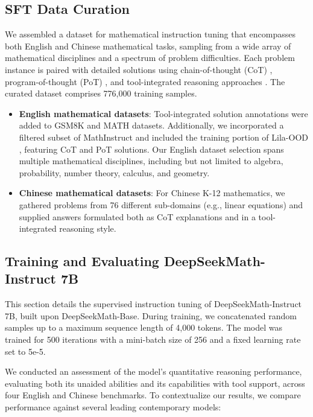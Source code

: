 \begin{itemize}[topsep=0pt]
\subsection{SFT Data Curation}

We assembled a dataset for mathematical instruction tuning that encompasses both English and Chinese mathematical tasks, sampling from a wide array of mathematical disciplines and a spectrum of problem difficulties. Each problem instance is paired with detailed solutions using chain-of-thought (CoT) \citep{cot}, program-of-thought (PoT) \citep{pot,pal}, and tool-integrated reasoning approaches \citep{tora}. The curated dataset comprises 776,000 training samples.

\begin{itemize}[topsep=0pt]
    \item \textbf{English mathematical datasets}: Tool-integrated solution annotations were added to GSM8K and MATH datasets. Additionally, we incorporated a filtered subset of MathInstruct \citep{MathInstruct} and included the training portion of Lila-OOD \citep{lila}, featuring CoT and PoT solutions. Our English dataset selection spans multiple mathematical disciplines, including but not limited to algebra, probability, number theory, calculus, and geometry.
    \item \textbf{Chinese mathematical datasets}: For Chinese K-12 mathematics, we gathered problems from 76 different sub-domains (e.g., linear equations) and supplied answers formulated both as CoT explanations and in a tool-integrated reasoning style.
\end{itemize}

\subsection{Training and Evaluating DeepSeekMath-Instruct 7B}

This section details the supervised instruction tuning of DeepSeekMath-Instruct 7B, built upon DeepSeekMath-Base. During training, we concatenated random samples up to a maximum sequence length of 4,000 tokens. The model was trained for 500 iterations with a mini-batch size of 256 and a fixed learning rate set to 5e-5.

We conducted an assessment of the model’s quantitative reasoning performance, evaluating both its unaided abilities and its capabilities with tool support, across four English and Chinese benchmarks. To contextualize our results, we compare performance against several leading contemporary models:


\end{itemize}
